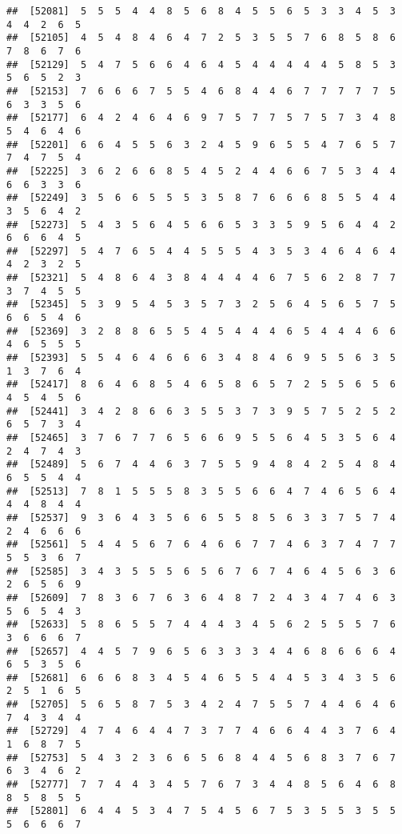 \documentclass[
]{book}
\begin{document}
\begin{verbatim}
##  [52081]  5  5  5  4  4  8  5  6  8  4  5  5  6  5  3  3  4  5  3  4  4  2  6  5
##  [52105]  4  5  4  8  4  6  4  7  2  5  3  5  5  7  6  8  5  8  6  7  8  6  7  6
##  [52129]  5  4  7  5  6  6  4  6  4  5  4  4  4  4  4  5  8  5  3  5  6  5  2  3
##  [52153]  7  6  6  6  7  5  5  4  6  8  4  4  6  7  7  7  7  7  5  6  3  3  5  6
##  [52177]  6  4  2  4  6  4  6  9  7  5  7  7  5  7  5  7  3  4  8  5  4  6  4  6
##  [52201]  6  6  4  5  5  6  3  2  4  5  9  6  5  5  4  7  6  5  7  7  4  7  5  4
##  [52225]  3  6  2  6  6  8  5  4  5  2  4  4  6  6  7  5  3  4  4  6  6  3  3  6
##  [52249]  3  5  6  6  5  5  5  3  5  8  7  6  6  6  8  5  5  4  4  3  5  6  4  2
##  [52273]  5  4  3  5  6  4  5  6  6  5  3  3  5  9  5  6  4  4  2  6  6  6  4  5
##  [52297]  5  4  7  6  5  4  4  5  5  5  4  3  5  3  4  6  4  6  4  4  2  3  2  5
##  [52321]  5  4  8  6  4  3  8  4  4  4  4  6  7  5  6  2  8  7  7  3  7  4  5  5
##  [52345]  5  3  9  5  4  5  3  5  7  3  2  5  6  4  5  6  5  7  5  6  6  5  4  6
##  [52369]  3  2  8  8  6  5  5  4  5  4  4  4  6  5  4  4  4  6  6  4  6  5  5  5
##  [52393]  5  5  4  6  4  6  6  6  3  4  8  4  6  9  5  5  6  3  5  1  3  7  6  4
##  [52417]  8  6  4  6  8  5  4  6  5  8  6  5  7  2  5  5  6  5  6  4  5  4  5  6
##  [52441]  3  4  2  8  6  6  3  5  5  3  7  3  9  5  7  5  2  5  2  6  5  7  3  4
##  [52465]  3  7  6  7  7  6  5  6  6  9  5  5  6  4  5  3  5  6  4  2  4  7  4  3
##  [52489]  5  6  7  4  4  6  3  7  5  5  9  4  8  4  2  5  4  8  4  6  5  5  4  4
##  [52513]  7  8  1  5  5  5  8  3  5  5  6  6  4  7  4  6  5  6  4  4  4  8  4  4
##  [52537]  9  3  6  4  3  5  6  6  5  5  8  5  6  3  3  7  5  7  4  2  4  6  6  6
##  [52561]  5  4  4  5  6  7  6  4  6  6  7  7  4  6  3  7  4  7  7  5  5  3  6  7
##  [52585]  3  4  3  5  5  5  6  5  6  7  6  7  4  6  4  5  6  3  6  2  6  5  6  9
##  [52609]  7  8  3  6  7  6  3  6  4  8  7  2  4  3  4  7  4  6  3  5  6  5  4  3
##  [52633]  5  8  6  5  5  7  4  4  4  3  4  5  6  2  5  5  5  7  6  3  6  6  6  7
##  [52657]  4  4  5  7  9  6  5  6  3  3  3  4  4  6  8  6  6  6  4  6  5  3  5  6
##  [52681]  6  6  6  8  3  4  5  4  6  5  5  4  4  5  3  4  3  5  6  2  5  1  6  5
##  [52705]  5  6  5  8  7  5  3  4  2  4  7  5  5  7  4  4  6  4  6  7  4  3  4  4
##  [52729]  4  7  4  6  4  4  7  3  7  7  4  6  6  4  4  3  7  6  4  1  6  8  7  5
##  [52753]  5  4  3  2  3  6  6  5  6  8  4  4  5  6  8  3  7  6  7  6  3  4  6  2
##  [52777]  7  7  4  4  3  4  5  7  6  7  3  4  4  8  5  6  4  6  8  8  5  8  5  5
##  [52801]  6  4  4  5  3  4  7  5  4  5  6  7  5  3  5  5  3  5  5  5  6  6  6  7

\end{verbatim}
\end{document}
